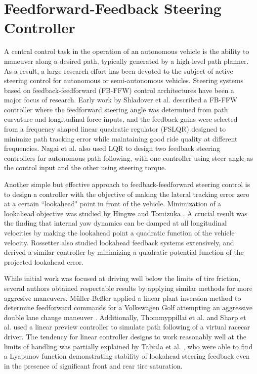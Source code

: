 \chapter{Feedforward-Feedback Steering Controller} 
\label{chapter2}

 A central control task in the operation of an autonomous vehicle is the ability
to maneuver along a desired path, typically generated by a high-level path planner. As a result, a large research effort has been 
devoted to the subject of active steering control for autonomous or semi-autonomous vehicles. Steering systems based on feedback-feedforward (FB-FFW)
control architectures have been a major focus of research. Early
 work by Shladover et al. \cite{shladover} described a FB-FFW controller where the feedforward
steering angle was determined from path curvature and longitudinal force inputs, and the feedback gains were 
selected from a frequency shaped linear quadratic regulator (FSLQR) designed to
 minimize path tracking error while maintaining good ride quality at different frequencies. Nagai et al. \cite{nagai} also used LQR to design two feedback steering controllers for autonomous path following, with one controller using steer angle as the control input
and the other using steering torque. 

Another simple but effective approach to feedback-feedforward steering control is to design a controller with the objective of
making the lateral tracking error zero at a certain ``lookahead" point in front of the vehicle. Minimization of a lookahead
objective was studied by Hingwe and Tomizuka \cite{hingwe}.
A crucial result was the finding that internal yaw dynamics can be damped at all longitudinal velocities by making the
lookahead point a quadratic function of the vehicle velocity. Rossetter \cite{rosseter} also studied lookahead feedback systems extensively,
and derived a similar controller by minimizing a quadratic potential function of the projected lookahead error. 

While initial work was focused at driving well below the limits of tire friction, several
authors obtained respectable results by applying similar methods for more aggresive maneuvers. M{\"u}ller-Be{\ss}ler 
applied a linear plant inversion method to determine feedforward commands for a Volkswagen Golf attempting an aggressive double lane change
maneuver \cite{bessyboy}. Additionally, Thommyppillai et al. \cite{tommyboy} and Sharp et al. \cite{sharpysharp} used a linear preview controller
to simulate path following of a virtual racecar driver. The tendency for linear controller designs to work reasonably well at the limits
 of handling was partially explained by Talvala et al. \cite{talvala}, who were able to find a Lyapunov function demonstrating stability of lookahead steering feedback 
 even in the presence of significant front and rear tire saturation. 

